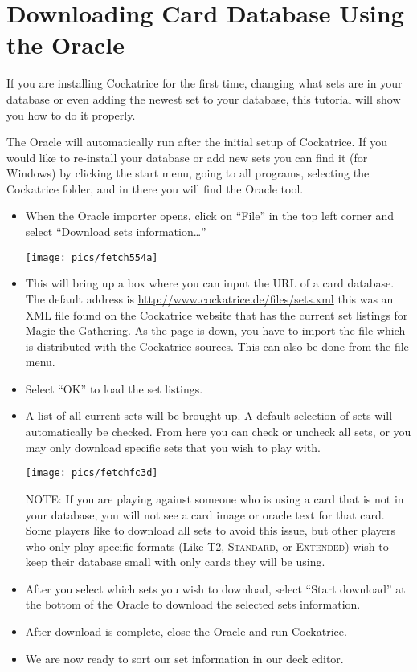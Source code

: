 \documentclass[a4paper]{scrbook}
\begin{document}
\section{Downloading Card Database Using the Oracle}
If you are installing Cockatrice for the first time, changing what sets are in your database or even adding the newest set to your database, this tutorial will show you how to do it properly.

The Oracle will automatically run after the initial setup of Cockatrice. If you would like to re-install your database or add new sets you can find it (for Windows) by clicking the start menu, going to all programs, selecting the Cockatrice folder, and in there you will find the Oracle tool.
\begin{itemize}
 \item When the Oracle importer opens, click on “File” in the top left corner and select “Download sets information…”
 \begin{center}
\texttt{[image: pics/fetch554a]}
 \end{center}
 \item This will bring up a box where you can input the URL of a card database. The default address is \url{http://www.cockatrice.de/files/sets.xml} this was an XML file found on the Cockatrice website that has the current set listings for Magic the Gathering. As the page is down, you have to import the file which is distributed with the Cockatrice sources.
 This can also be done from the file menu.
 \item Select “OK” to load the set listings.
 \item A list of all current sets will be brought up. A default selection of sets will automatically be checked. From here you can check or uncheck all sets, or you may only download specific sets that you wish to play with.
  \begin{center}
\texttt{[image: pics/fetchfc3d]}
 \end{center}
NOTE: If you are playing against someone who is using a card that is not in your database, you will not see a card image or oracle text for that card. Some players like to download all sets to avoid this issue, but other players who only play specific formats (Like \textsc{T2}, \textsc{Standard}, or \textsc{Extended}) wish to keep their database small with only cards they will be using.
 \item After you select which sets you wish to download, select “Start download” at the bottom of the Oracle to download the selected sets information.
 \item After download is complete, close the Oracle and run Cockatrice.
 \item We are now ready to sort our set information in our deck editor.
\end{itemize}
\end{document}
